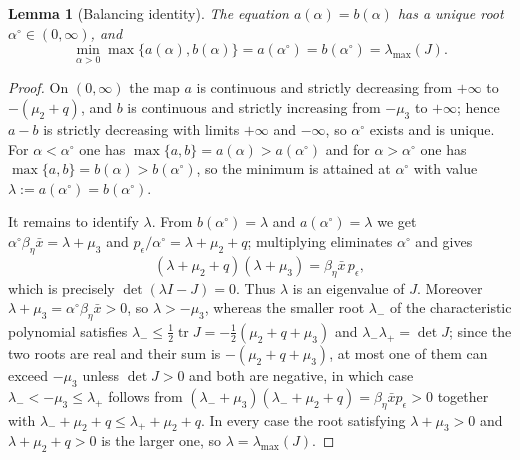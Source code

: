 \documentclass{article}
\newtheorem{lemma}{Lemma}[section]
\newcommand{\betaeta}{\beta_\eta}
\newcommand{\peps}{p_\epsilon}
\begin{document}
\begin{lemma}[Balancing identity]\label{lem:CW}
The equation $a(\alpha)=b(\alpha)$ has a unique root $\alpha^\circ\in(0,\infty)$, and
\begin{equation}\label{eq:CW}
\min_{\alpha>0}\max\{a(\alpha),b(\alpha)\}=a(\alpha^\circ)=b(\alpha^\circ)=\lambda_{\max}(J).
\end{equation}
\end{lemma}

\begin{proof}
On $(0,\infty)$ the map $a$ is continuous and strictly decreasing from $+\infty$ to $-(\mu_2+q)$, and $b$ is continuous and strictly increasing from $-\mu_3$ to $+\infty$; hence $a-b$ is strictly decreasing with limits $+\infty$ and $-\infty$, so $\alpha^\circ$ exists and is unique. For $\alpha<\alpha^\circ$ one has $\max\{a,b\}=a(\alpha)>a(\alpha^\circ)$ and for $\alpha>\alpha^\circ$ one has $\max\{a,b\}=b(\alpha)>b(\alpha^\circ)$, so the minimum is attained at $\alpha^\circ$ with value $\lambda:=a(\alpha^\circ)=b(\alpha^\circ)$.

It remains to identify $\lambda$. From $b(\alpha^\circ)=\lambda$ and $a(\alpha^\circ)=\lambda$ we get $\alpha^\circ\betaeta\bar x=\lambda+\mu_3$ and $\peps/\alpha^\circ=\lambda+\mu_2+q$; multiplying eliminates $\alpha^\circ$ and gives
\[
(\lambda+\mu_2+q)(\lambda+\mu_3)=\betaeta\bar x\,\peps ,
\]
which is precisely $\det(\lambda I-J)=0$. Thus $\lambda$ is an eigenvalue of $J$. Moreover $\lambda+\mu_3=\alpha^\circ\betaeta\bar x>0$, so $\lambda>-\mu_3$, whereas the smaller root $\lambda_-$ of the characteristic polynomial satisfies $\lambda_-\le\tfrac12\operatorname{tr}J=-\tfrac12(\mu_2+q+\mu_3)$ and $\lambda_-\lambda_+=\det J$; since the two roots are real and their sum is $-(\mu_2+q+\mu_3)$, at most one of them can exceed $-\mu_3$ unless $\det J>0$ and both are negative, in which case $\lambda_-<-\mu_3\le\lambda_+$ follows from $(\lambda_-+\mu_3)(\lambda_-+\mu_2+q)=\betaeta\bar x\peps>0$ together with $\lambda_-+\mu_2+q\le\lambda_++\mu_2+q$. In every case the root satisfying $\lambda+\mu_3>0$ and $\lambda+\mu_2+q>0$ is the larger one, so $\lambda=\lambda_{\max}(J)$.
\end{proof}
\end{document}
